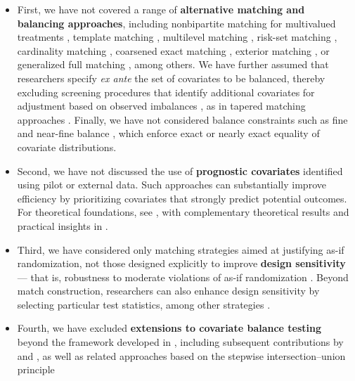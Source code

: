 \documentclass[
  12pt,
  leqno]{article}
\begin{document}
\begin{itemize}
\item
  First, we have not covered a range of \textbf{alternative matching and
  balancing approaches}, including nonbipartite matching for multivalued
  treatments
  \citep[pp.~207--221]{luetal2001, luetal2011, rosenbaum2010}, template
  matching \citep{silberetal2014}, multilevel matching
  \citep{zubizarretakeele2017, pimenteletal2018}, risk-set matching
  \citep{lietal2001}, cardinality matching \citep{zubizarretaetal2014},
  coarsened exact matching \citep{iacusetal2012}, exterior matching
  \citep{rosenbaumsilber2013}, or generalized full matching
  \citep{savjeetal2021}, among others. We have further assumed that
  researchers specify \emph{ex ante} the set of covariates to be
  balanced, thereby excluding screening procedures that identify
  additional covariates for adjustment based on observed imbalances
  \citep{cochran1965}, as in tapered matching approaches
  \citep{danieletal2008, yuetal2021}. Finally, we have not considered
  balance constraints such as fine and near-fine balance
  \citep{rosenbaumetal2007, yangetal2012, yu2023, pimenteletal2015a, pimenteletal2015b},
  which enforce exact or nearly exact equality of covariate
  distributions.
\item
  Second, we have not discussed the use of \textbf{prognostic
  covariates} identified using pilot or external data. Such approaches
  can substantially improve efficiency by prioritizing covariates that
  strongly predict potential outcomes. For theoretical foundations, see
  \citet{hansen2008a}, with complementary theoretical results and
  practical insights in \citet{salesetal2018}.
\item
  Third, we have considered only matching strategies aimed at justifying
  as-if randomization, not those designed explicitly to improve
  \textbf{design sensitivity} --- that is, robustness to moderate
  violations of as-if randomization \citep[see][Part III,
  pp.~257-311]{rosenbaum2010}. Beyond match construction, researchers
  can also enhance design sensitivity by selecting particular test
  statistics, among other strategies
  \citep{rosenbaum2004, helleretal2009, hsuetal2013, smalletal2013}.
\item
  Fourth, we have excluded \textbf{extensions to covariate balance
  testing} beyond the framework developed in \citet{hansenbowers2008},
  including subsequent contributions by
  \citet{gagnon-bartschshem-tov2019} and \citet{branson2021}, as well as
  related approaches based on the stepwise intersection--union principle

\end{itemize}
\end{document}
